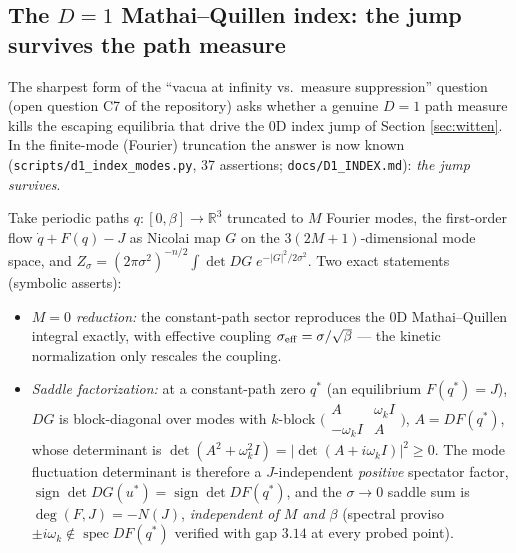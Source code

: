 \documentclass[11pt]{article}
\theoremstyle{definition}
\theoremstyle{remark}
\newcommand{\R}{\mathbb{R}}
\begin{document}
\subsection{The $D=1$ Mathai--Quillen index: the jump survives the
path measure}\label{sec:d1index}

The sharpest form of the ``vacua at infinity vs.\ measure
suppression'' question (open question C7 of the repository) asks
whether a genuine $D=1$ path measure kills the escaping equilibria
that drive the 0D index jump of Section \ref{sec:witten}. In the
finite-mode (Fourier) truncation the answer is now known
(\texttt{scripts/d1\_index\_modes.py}, 37 assertions;
\texttt{docs/D1\_INDEX.md}): \emph{the jump survives}.

Take periodic paths $q:[0,\beta]\to\R^3$ truncated to $M$ Fourier
modes, the first-order flow $\dot q+F(q)-J$ as Nicolai map $G$ on the
$3(2M{+}1)$-dimensional mode space, and
$Z_\sigma=(2\pi\sigma^2)^{-n/2}\int\det DG\;e^{-|G|^2/2\sigma^2}$. Two
exact statements (symbolic asserts):

\begin{itemize}
\item \emph{$M=0$ reduction:} the constant-path sector reproduces the
 0D Mathai--Quillen integral exactly, with effective coupling
 $\sigma_{\rm eff}=\sigma/\sqrt\beta$ — the kinetic normalization
 only rescales the coupling.
\item \emph{Saddle factorization:} at a constant-path zero $q^*$ (an
 equilibrium $F(q^*)=J$), $DG$ is block-diagonal over modes with
 $k$-block $\bigl(\begin{smallmatrix}A&\omega_k I\\ -\omega_k I&A
 \end{smallmatrix}\bigr)$, $A=DF(q^*)$, whose determinant is
 $\det(A^2+\omega_k^2 I)=\lvert\det(A+i\omega_k I)\rvert^2\ge 0$.
 The mode fluctuation determinant is therefore a $J$-independent
 \emph{positive} spectator factor, $\operatorname{sign}\det DG(u^*) =
 \operatorname{sign}\det DF(q^*)$, and the $\sigma\to0$ saddle sum is
 $\deg(F,J)=-N(J)$, \emph{independent of $M$ and $\beta$} (spectral
 proviso $\pm i\omega_k\notin\operatorname{spec}DF(q^*)$ verified with
 gap $3.14$ at every probed point).
\end{itemize}
\end{document}
